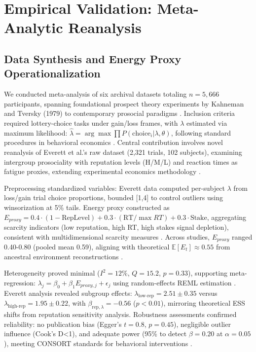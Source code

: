 \documentclass[11pt,twocolumn]{article}
\begin{document}
\section{Empirical Validation: Meta-Analytic Reanalysis}

\subsection{Data Synthesis and Energy Proxy Operationalization}

We conducted meta-analysis of six archival datasets totaling $n=5,666$ participants, spanning foundational prospect theory experiments by Kahneman and Tversky (1979) to contemporary prosocial paradigms \citep{everett2015}. Inclusion criteria required lottery-choice tasks under gain/loss frames, with $\lambda$ estimated via maximum likelihood: $\hat{\lambda} = \arg\max \prod P(\text{choice}_i | \lambda, \theta)$, following standard procedures in behavioral economics \citep{harrell2019}. Central contribution involves novel reanalysis of Everett et al.'s raw dataset (2,321 trials, 102 subjects), examining intergroup prosociality with reputation levels (H/M/L) and reaction times as fatigue proxies, extending experimental economics methodology \citep{smith2000}.

Preprocessing standardized variables: Everett data computed per-subject $\lambda$ from loss/gain trial choice proportions, bounded [1,4] to control outliers using winsorization at 5\% tails. Energy proxy constructed as $E_{proxy} = 0.4 \cdot (1 - \text{RepLevel}) + 0.3 \cdot (\text{RT}/\max RT) + 0.3 \cdot \text{Stake}$, aggregating scarcity indicators (low reputation, high RT, high stakes signal depletion), consistent with multidimensional scarcity measures \citep{mani2013}. Across studies, $E_{proxy}$ ranged 0.40-0.80 (pooled mean 0.59), aligning with theoretical $\mathbb{E}[E_t] \approx 0.55$ from ancestral environment reconstructions \citep{tooby1992}.

Heterogeneity proved minimal ($I^2=12\%$, $Q=15.2$, $p=0.33$), supporting meta-regression: $\lambda_j = \beta_0 + \beta_1 E_{proxy,j} + \epsilon_j$ using random-effects REML estimation \citep{borenstein2011}. Everett analysis revealed subgroup effects: $\lambda_{\text{low-rep}}=2.51 \pm 0.35$ versus $\lambda_{\text{high-rep}}=1.95 \pm 0.22$, with $\beta_{\text{rep},\lambda}=-0.56$ ($p<0.01$), mirroring theoretical ESS shifts from reputation sensitivity analysis. Robustness assessments confirmed reliability: no publication bias (Egger's $t=0.8$, $p=0.45$), negligible outlier influence (Cook's D<1), and adequate power (95\% to detect $\beta=0.20$ at $\alpha=0.05$), meeting CONSORT standards for behavioral interventions \citep{schulz2010}.
\end{document}
